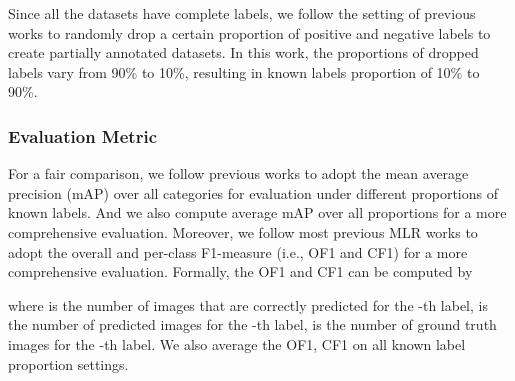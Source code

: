 \documentclass[lettersize,journal]{IEEEtran}
\begin{document}
Since all the datasets have complete labels, we follow the setting of previous works \cite{Durand2019CVPR, Huynh2020CVPR} to randomly drop a certain proportion of positive and negative labels to create partially annotated datasets. In this work, the proportions of dropped labels vary from 90\% to 10\%, resulting in known labels proportion of 10\% to 90\%. 

\subsubsection{Evaluation Metric} For a fair comparison, we follow previous works \cite{Durand2019CVPR, Huynh2020CVPR} to adopt the mean average precision (mAP) over all categories for evaluation under different proportions of known labels. And we also compute average mAP over all proportions for a more comprehensive evaluation. Moreover, we follow most previous MLR works \cite{Chen2019SSGRL} to adopt the overall and per-class F1-measure (i.e., OF1 and CF1) for a more comprehensive evaluation. Formally, the OF1 and CF1 can be computed by

where  is the number of images that are correctly predicted for the -th label,  is the number of predicted images for the -th label,  is the number of ground truth images for the -th label. We also average the OF1, CF1 on all known label proportion settings.
\end{document}
